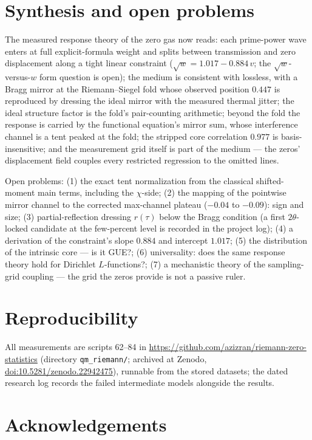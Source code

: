 \documentclass[12pt]{amsart}
\begin{document}
\section{Synthesis and open problems}

The measured response theory of the zero gas now reads: each prime-power
wave enters at full explicit-formula weight and splits between
transmission and zero displacement along a tight linear constraint
($\sqrt{w} = 1.017 - 0.884\,v$; the $\sqrt{w}$-versus-$w$ form question
is open); the medium is consistent with lossless, with a Bragg mirror at
the Riemann--Siegel fold whose observed position $0.447$ is reproduced
by dressing the ideal mirror with the measured thermal jitter; the ideal
structure factor is the fold's pair-counting arithmetic; beyond the fold
the response is carried by the functional equation's mirror sum, whose
interference channel is a tent peaked at the fold; the stripped core
correlation $0.977$ is basis-insensitive; and the measurement grid
itself is part of the medium --- the zeros' displacement field couples
every restricted regression to the omitted lines.

Open problems: (1) the exact tent normalization from the classical
shifted-moment main terms, including the $\chi$-side; (2) the mapping
of the pointwise mirror channel to the corrected max-channel plateau
($-0.04$ to $-0.09$): sign and size; (3) partial-reflection dressing
$r(\tau)$ below the Bragg condition (a first $2\theta$-locked candidate
at the few-percent level is recorded in the project log); (4) a
derivation of the constraint's slope $0.884$ and intercept $1.017$;
(5) the distribution of the intrinsic core --- is it GUE?; (6)
universality: does the same response theory hold for Dirichlet
$L$-functions?; (7) a mechanistic theory of the sampling-grid coupling
--- the grid the zeros provide is not a passive ruler.

\section*{Reproducibility}

All measurements are scripts 62--84 in
\url{https://github.com/azizran/riemann-zero-statistics} (directory
\texttt{qm\_riemann/}; archived at Zenodo,
\href{https://doi.org/10.5281/zenodo.22942475}{doi:10.5281/zenodo.22942475}),
runnable from the stored datasets; the dated research log records the
failed intermediate models alongside the results.

\section*{Acknowledgements}
\end{document}
